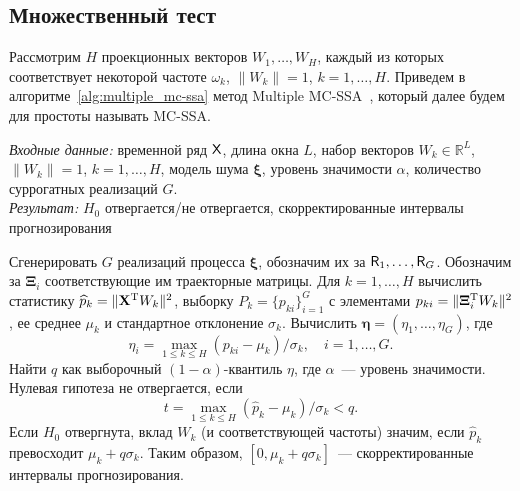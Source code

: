 \documentclass[specialist,
substylefile = spbu_report.rtx,
subf,12pt]{disser}
\newcommand{\Input}{\emph{Входные данные: }}
\newcommand{\Output}{\emph{Результат: }}
\theoremstyle{definition}
\newcommand{\R}{\mathbb{R}}
\begin{document}
\subsection{Множественный тест}\label{sect:multiple_test}
Рассмотрим $H$ проекционных векторов $W_1,\ldots,W_H$, каждый из которых соответствует некоторой частоте $\omega_k$, $\|W_k\|=1$, $k=1,\ldots,H$. Приведем в алгоритме~\ref{alg:multiple_mc-ssa} метод Multiple MC-SSA~\cite{Golyandina2023}, который далее будем для простоты называть MC-SSA.
\begin{algorithm}[!ht]
	\caption{Multiple MC-SSA~\cite{Golyandina2023}}\label{alg:multiple_mc-ssa}
	\Input временной ряд $\mathsf{X}$, длина окна $L$, набор векторов $W_k\in \R^L$, $\|W_k\|=1$, $k=1,\ldots, H$, модель шума $\bm\xi$, уровень значимости $\alpha$, количество суррогатных реализаций $G$.\\
	\Output $H_0$ отвергается/не отвергается, скорректированные интервалы прогнозирования
	\begin{algorithmic}[1]
		\State Сгенерировать $G$ реализаций процесса $\bm\xi$, обозначим их за $\mathsf{R}_1, \ldots, \mathsf{R}_G$. Обозначим за $\bm\Xi_i$ соответствующие им траекторные матрицы.
		\State Для $k=1,\dots,H$ вычислить статистику $\widehat{p}_k=\|\mathbf{X}^{\mathrm{T}} W_k\|^2$, выборку $P_k=\{p_{ki}\}_{i=1}^G$ с элементами $p_{ki}=\|\bm\Xi_i^{\mathrm{T}} W_k\|^2$, ее среднее $\mu_k$ и стандартное отклонение $\sigma_k$.
		\State Вычислить $\mathbf{\eta}=(\eta_1,\dots,\eta_G)$, где
		\[
			\eta_i=\max_{1\leqslant k\leqslant H}(p_{ki}-\mu_k)/\sigma_k,\quad i=1,\dots,G.
		\]
		\State Найти $q$ как выборочный $(1-\alpha)$-квантиль $\eta$, где $\alpha$~--- уровень значимости.
		\State Нулевая гипотеза не отвергается, если
		\[
			t = \max_{1\leqslant k\leqslant H}(\widehat{p}_k-\mu_k)/\sigma_k<q.
		\]
		\State Если $H_0$ отвергнута, вклад $W_k$ (и соответствующей частоты) значим, если $\widehat{p}_k$ превосходит $\mu_k+q\sigma_k$. Таким образом, $[0,\mu_k+q\sigma_k]$~--- скорректированные интервалы прогнозирования.
	\end{algorithmic}
\end{algorithm}
\end{document}
